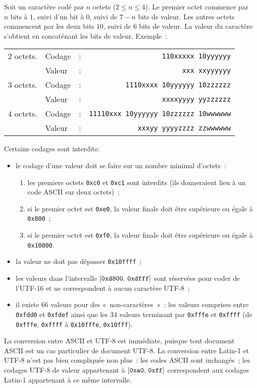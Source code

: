 \documentclass[12pt]{article}
\begin{document}
Soit un caractère codé par $n$ octets ($2 \leq n \leq 4$).
Le premier octet commence par $n$ bits à $1$, suivi d'un bit à $0$,
suivi de $7-n$ bits de valeur. Les autres octets commencent par les deux
bits $10$, suivi de $6$ bits de valeur.
La valeur du caractère s'obtient en concaténant les bits de valeur.
Exemple~:

\smallskip

\begin{tabular}{lllr}
$2$ octets. & Codage & : & {\tt 110xxxxx 10yyyyyy}\\ 
	    & Valeur & : & {\tt xxx xxyyyyyy} \\
$3$ octets. & Codage & : & {\tt 1110xxxx 10yyyyyy 10zzzzzz} \\
            & Valeur & : & {\tt xxxxyyyy yyzzzzzz} \\
$4$ octets. & Codage & : & {\tt 11110xxx 10yyyyyy 10zzzzzz 10wwwwww} \\
            & Valeur & : & {\tt xxxyy yyyyzzzz zzwwwwww}
\end{tabular}

\smallskip

\noindent
Certains codages sont interdits:
\begin{itemize}
\item
le codage d'une valeur doit se faire sur un nombre minimal d'octets~:
\begin{enumerate}
\item
les premiers octets {\tt 0xc0} et {\tt 0xc1} sont interdits (ils
        donneraient lieu à un code ASCII sur deux octets)~;
\item
si le premier octet est {\tt 0xe0}, la valeur finale doit être
supérieure ou égale à {\tt 0x800}~;
\item
si le premier octet est {\tt 0xf0}, la valeur finale doit être
supérieure ou égale à {\tt 0x10000}.
\end{enumerate}
\item
la valeur ne doit pas dépasser {\tt 0x10ffff}~;
\item
les valeurs dans l'intervalle $[\mbox{\tt 0xd800},\, \mbox{\tt 0xdfff}]$ 
sont réservées pour coder de l'UTF-16 et ne correspondent à aucun 
caractère UTF-8~;
\item
il existe $66$ valeurs pour des «~non-caractères~»~: les valeurs
comprises entre {\tt 0xfdd0} et {\tt 0xfdef} ainsi que les $34$
valeurs terminant par {\tt 0xfffe} et {\tt 0xffff} (de
{\tt 0xfffe}, {\tt 0xffff} à {\tt 0x10fffe}, {\tt 0x10fff}).
\end{itemize}
La conversion entre ASCII et UTF-8 est immédiate, puisque 
tout document ASCII est un cas particulier de document UTF-8.
La conversion entre Latin-1 et UTF-8 n'est pas bien compliquée
non plus~: les codes ASCII sont inchangés~; les codages UTF-8 de
valeur appartenant à $[\mbox{\tt 0xa0},\, \mbox{\tt 0xff}]$ correspondent
aux codages Latin-1 appartenant à ce même intervalle.
\end{document}
